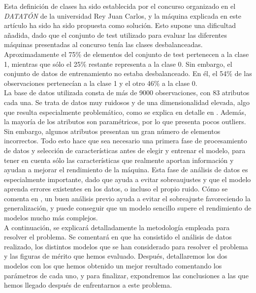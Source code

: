 \documentclass[journal,twoside]{JoPhA}
\begin{document}
Esta definición de clases ha sido establecida por el concurso organizado en el \textit{DATATÓN} de la universidad Rey Juan Carlos, y la máquina explicada en este artículo ha sido ha sido propuesta como solución. Esto supone una dificultad añadida, dado que el conjunto de test utilizado para evaluar las diferentes máquinas presentadas al concurso tenía las clases desbalanceadas. Aproximadamente el 75\% de elementos del conjunto de test pertenecen a la clase 1, mientras que sólo el 25\% restante representa a la clase 0. Sin embargo, el conjunto de datos de entrenamiento no estaba desbalanceado. En él, el 54\% de las observaciones pertenecían a la clase 1 y el otro 46\% a la clase 0. \\

La base de datos utilizada consta de más de 9000 observaciones, con 83 atributos cada una. Se trata de datos muy ruidosos y de una dimensionalidad elevada, algo que resulta especialmente problemático, como se explica en detalle en \cite{alta_dimensionalidad}. Además, la mayoría de los atributos son paramétricos, por lo que presenta pocos outliers. Sin embargo, algunos atributos presentan un gran número de elementos incorrectos. Todo esto hace que sea necesario una primera fase de procesamiento de datos y selección de características antes de elegir y entrenar el modelo, para tener en cuenta sólo las características que realmente aportan información y ayudan a mejorar el rendimiento de la máquina. Esta fase de análisis de datos es especialmente importante, dado que ayuda a evitar sobreaujustes y que el modelo aprenda errores existentes en los datos, o incluso el propio ruido. Cómo se comenta en \cite{extraccion_datos}, un buen análisis previo ayuda a evitar el sobreajuste favoreciendo la generalización, y puede conseguir que un modelo sencillo supere el rendimiento de modelos mucho más complejos. \\

A continuación, se explicará detalladamente la metodología empleada para resolver el problema. Se comentará en que ha consistido el análisis de datos realizado, los distintos modelos que se han considerado para resolver el problema y las figuras de mérito que hemos evaluado. Después, detallaremos los dos modelos con los que hemos obtenido un mejor resultado comentando los parámetros de cada uno, y para finalizar, expondremos las conclusiones a las que hemos llegado después de enfrentarnos a este problema. \\


\end{document}
